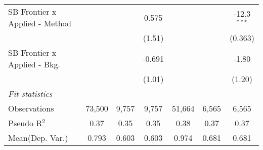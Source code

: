 \begin{tabular}{lcccccc}
   SB Frontier x Applied - Method &               &               & 0.575        &               &               & -12.3$^{***}$\\   
                                  &               &               & (1.51)       &               &               & (0.363)\\   
   SB Frontier x Applied - Bkg.   &               &               & -0.691       &               &               & -1.80\\   
                                  &               &               & (1.01)       &               &               & (1.20)\\   
   \midrule
   \emph{Fit statistics}\\
   Observations                   & 73,500        & 9,757         & 9,757        & 51,664        & 6,565         & 6,565\\  
   Pseudo R$^2$                   & 0.37          & 0.35          & 0.35         & 0.38          & 0.37          & 0.37\\  
Mean(Dep. Var.) & 0.793 & 0.603 & 0.603 & 0.974 & 0.681 & 0.681 \\
   

\end{tabular}
